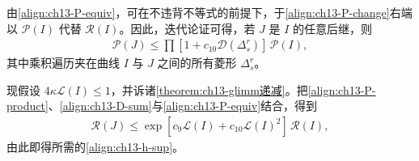 \documentclass[../../main.tex]{subfiles}
\begin{document}
由\eqref{align:ch13-P-equiv}，可在不违背不等式的前提下，于\eqref{align:ch13-P-change}右端以 $\mathscr{P}(I)$ 代替 $\mathscr{R}(I)$。因此，迭代论证可得，若 $J$ 是 $I$ 的任意后继，则
\begin{align}
\mathscr{P}(J)\leqslant\prod[1+c_{10}\mathscr{D}(\Delta_s^r)]\,\mathscr{P}(I),
\label{align:ch13-P-product}
\end{align}
其中乘积遍历夹在曲线 $I$ 与 $J$ 之间的所有菱形 $\Delta_s^r$。

现假设 $4\kappa\mathscr{L}(I)\leqslant1$，并诉诸\cref{theorem:ch13-glimm递减}。把\eqref{align:ch13-P-product}、\eqref{align:ch13-D-sum}与\eqref{align:ch13-P-equiv}结合，得到
\begin{align}
\mathscr{R}(J)\leqslant\exp[c_9\mathscr{L}(I)+c_{10}\mathscr{L}(I)^2]\,\mathscr{R}(I),
\label{align:ch13-R-exp}
\end{align}
由此即得所需的\eqref{align:ch13-h-sup}。
\end{document}
